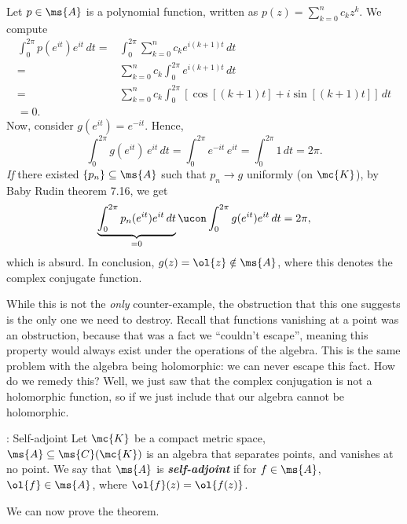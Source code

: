 \medskip

Let \(p\in\ms{A}\) is a polynomial function, written as \(\displaystyle p(z)=\sum_{k=0}^n c_kz^k\). We compute 
\begin{align*} 
    \int_{0}^{2\pi} p(e^{it}) e^{it} \, dt=&\int_{0}^{2\pi}\sum_{k=0}^n c_ke^{i(k+1)t} \, dt\\
    =&\sum_{k=0}^n c_k\int_0^{2\pi} e^{i(k+1)t} \, dt\\
    =&\sum_{k=0}^n c_k\int_0^{2\pi} \left[\cos{[(k+1)t]}+i\sin{[(k+1)t]}\right] \, dt\\
    =0.
\end{align*}
Now, consider \(g(e^{it})=e^{-it}\). Hence, 
\begin{equation*} 
    \int_{0}^{2\pi} g(e^{it}) \, e^{it} \, dt=\int_{0}^{2\pi} e^{-it} \, e^{it}=\int_0^{2\pi} 1\, dt=2\pi.
\end{equation*}
\emph{If} there existed \(\{p_n\}\subseteq\ms{A}\) such that \(p_n\to g\) uniformly (on \(\mc{K}\)), by Baby Rudin theorem 7.16, we get 
\begin{equation*} 
    \underbrace{\int_0^{2\pi} p_n(e^{it}) e^{it} \, dt}_{=0}\ucon\int_0^{2\pi} g(e^{it}) e^{it} \, dt=2\pi,
\end{equation*}
which is absurd.
In conclusion, \(g(z)=\ol{z}\notin\ms{A}\), where this denotes the complex conjugate function.

\medskip

While this is not the \emph{only} counter-example, the obstruction that this one suggests is the only one we need to destroy. Recall that functions vanishing at a point was an obstruction, because that was a fact we ``couldn't escape'', meaning this property would always exist under the operations of the algebra. This is the same problem with the algebra being holomorphic: we can never escape this fact. How do we remedy this? Well, we just saw that the complex conjugation is not a holomorphic function, so if we just include that our algebra cannot be holomorphic. 

\begin{ndef}{: Self-adjoint}
    Let \(\mc{K}\) be a compact metric space, \(\ms{A}\subseteq\ms{C}(\mc{K})\) is an algebra that separates points, and vanishes at no point. We say that \(\ms{A}\) is \emph{\textbf{self-adjoint}} if for \(f\in\ms{A}\), \(\ol{f}\in\ms{A}\), where \(\ol{f}(z)=\ol{f(z)}\).
\end{ndef}
We can now prove the theorem.

